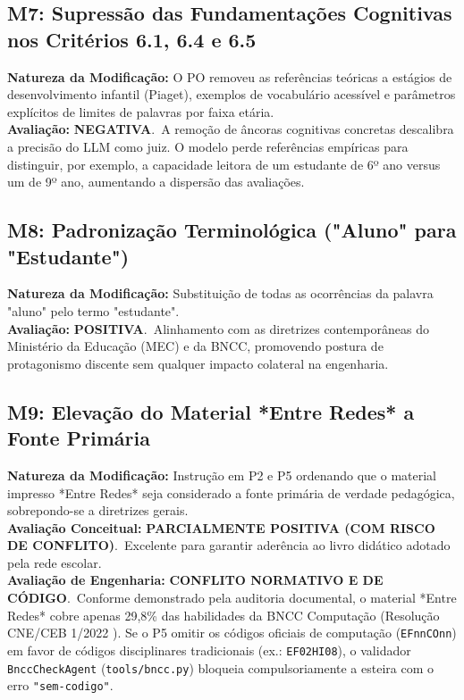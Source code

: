 \documentclass[11pt,a4paper]{article}
\begin{document}
\subsection{M7: Supressão das Fundamentações Cognitivas nos Critérios 6.1, 6.4 e 6.5}
\textbf{Natureza da Modificação:} O PO removeu as referências teóricas a estágios de desenvolvimento infantil (Piaget), exemplos de vocabulário acessível e parâmetros explícitos de limites de palavras por faixa etária.\\
\textbf{Avaliação:} \color{DarkRed}\textbf{NEGATIVA}.\normalfont\ A remoção de âncoras cognitivas concretas descalibra a precisão do LLM como juiz. O modelo perde referências empíricas para distinguir, por exemplo, a capacidade leitora de um estudante de 6º ano versus um de 9º ano, aumentando a dispersão das avaliações.

\subsection{M8: Padronização Terminológica ("Aluno" para "Estudante")}
\textbf{Natureza da Modificação:} Substituição de todas as ocorrências da palavra "aluno" pelo termo "estudante".\\
\textbf{Avaliação:} \color{DarkGreen}\textbf{POSITIVA}.\normalfont\ Alinhamento com as diretrizes contemporâneas do Ministério da Educação (MEC) e da BNCC, promovendo postura de protagonismo discente sem qualquer impacto colateral na engenharia.

\subsection{M9: Elevação do Material *Entre Redes* a Fonte Primária}
\textbf{Natureza da Modificação:} Instrução em P2 e P5 ordenando que o material impresso *Entre Redes* seja considerado a fonte primária de verdade pedagógica, sobrepondo-se a diretrizes gerais.\\
\textbf{Avaliação Conceitual:} \color{DarkYellow}\textbf{PARCIALMENTE POSITIVA (COM RISCO DE CONFLITO)}.\normalfont\ Excelente para garantir aderência ao livro didático adotado pela rede escolar. \\
\textbf{Avaliação de Engenharia:} \color{DarkRed}\textbf{CONFLITO NORMATIVO E DE CÓDIGO}.\normalfont\ Conforme demonstrado pela auditoria documental, o material *Entre Redes* cobre apenas 29,8\% das habilidades da BNCC Computação (Resolução CNE/CEB 1/2022 \cite{cne2022computacao}). Se o P5 omitir os códigos oficiais de computação (\texttt{EFnnCOnn}) em favor de códigos disciplinares tradicionais (ex.: \texttt{EF02HI08}), o validador \texttt{BnccCheckAgent} (\texttt{tools/bncc.py}) bloqueia compulsoriamente a esteira com o erro \texttt{"sem-codigo"}.
\end{document}
